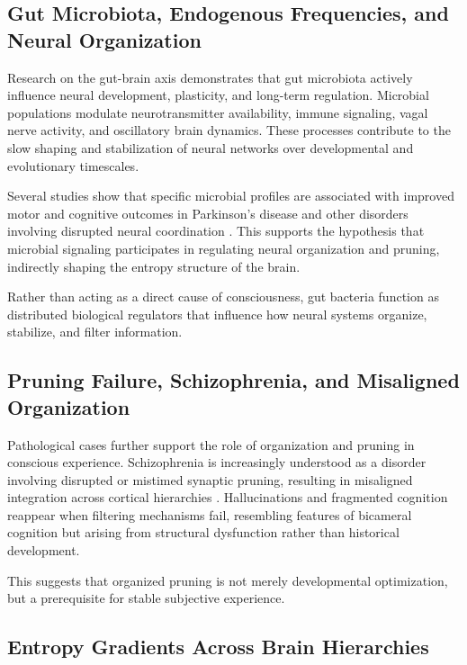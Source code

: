 \documentclass[12pt,letterpaper]{article}
\begin{document}
\subsection{Gut Microbiota, Endogenous Frequencies, and Neural Organization}

Research on the gut-brain axis demonstrates that gut microbiota actively influence neural development, plasticity, and long-term regulation. Microbial populations modulate neurotransmitter availability, immune signaling, vagal nerve activity, and oscillatory brain dynamics. These processes contribute to the slow shaping and stabilization of neural networks over developmental and evolutionary timescales.

Several studies show that specific microbial profiles are associated with improved motor and cognitive outcomes in Parkinson's disease and other disorders involving disrupted neural coordination \cite{sampson2016}. This supports the hypothesis that microbial signaling participates in regulating neural organization and pruning, indirectly shaping the entropy structure of the brain.

Rather than acting as a direct cause of consciousness, gut bacteria function as distributed biological regulators that influence how neural systems organize, stabilize, and filter information.

\subsection{Pruning Failure, Schizophrenia, and Misaligned Organization}

Pathological cases further support the role of organization and pruning in conscious experience. Schizophrenia is increasingly understood as a disorder involving disrupted or mistimed synaptic pruning, resulting in misaligned integration across cortical hierarchies \cite{sekar2016}. Hallucinations and fragmented cognition reappear when filtering mechanisms fail, resembling features of bicameral cognition but arising from structural dysfunction rather than historical development.

This suggests that organized pruning is not merely developmental optimization, but a prerequisite for stable subjective experience.

\subsection{Entropy Gradients Across Brain Hierarchies}
\end{document}
